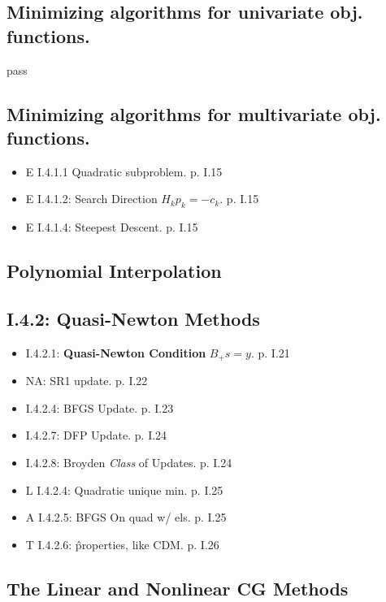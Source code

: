 \documentclass[11pt]{article}
\begin{document}
\subsection{Minimizing algorithms for univariate obj. functions.}
\label{sub:minimizing_algorithms_for_univariate_obj_functions}

  pass

\subsection{Minimizing algorithms for multivariate obj. functions.}
\label{sub:minimizing_algorithms_for_multivariate_obj_functions}

\begin{itemize}
  \item E I.4.1.1 Quadratic subproblem. p. I.15
  \item E I.4.1.2: Search Direction $H_k p_k = -c_k$. p. I.15
  \item E I.4.1.4: Steepest Descent. p. I.15
\end{itemize}

\subsection{Polynomial Interpolation}
\label{sub:polynomial_interpolation}

\subsection{I.4.2: Quasi-Newton Methods}
\label{sub:quasi_newton_methods}
  \begin{itemize}
    \item I.4.2.1: \textbf{Quasi-Newton Condition} $B_+ s = y$. p. I.21
    \item NA: SR1 update. p. I.22
    \item I.4.2.4: BFGS Update. p. I.23
    \item I.4.2.7: DFP Update. p. I.24
    \item I.4.2.8: Broyden \emph{Class} of Updates. p. I.24
    \item L I.4.2.4: Quadratic unique min. p. I.25
    \item A I.4.2.5: BFGS On quad w/ els. p. I.25
    \item T I.4.2.6: \^ properties, like CDM. p. I.26
  \end{itemize}

\subsection{The Linear and Nonlinear CG Methods}
\label{sub:the_linear_and_nonlinear_cg_methods}
\end{document}
